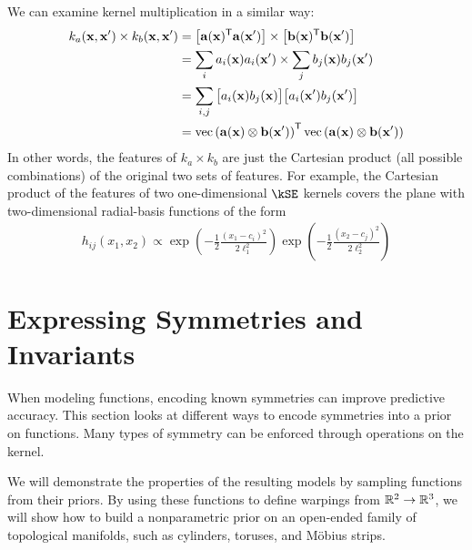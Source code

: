 We can examine kernel multiplication in a similar way:
%
\begin{align}
k_a({\bf{x}}, {\bf{x}}') \times k_b({\bf{x}}, {\bf{x}}')
& = \left[ {\bf{a}}({\bf{x}})^{\mathsf{T}} {\bf{a}}({\bf{x}}') \right] \times \left[ {\bf{b}}({\bf{x}})^{\mathsf{T}} {\bf{b}}({\bf{x}}') \right] \\
& = \sum_i a_i({\bf{x}}) a_i({\bf{x}}') \times \sum_j b_j({\bf{x}}) b_j({\bf{x}}') \\
& = \sum_{i,j} \big[ a_i({\bf{x}}) b_j({\bf{x}}) \big] \big[ a_i({\bf{x}}') b_j({\bf{x}}') \big] \\
& = \operatorname{vec} \left( { {\bf{a}}({\bf{x}}) \otimes {\bf{b}}({\bf{x}}') } \right) ^{\mathsf{T}} \operatorname{vec} \left( { {\bf{a}}({\bf{x}}) \otimes {\bf{b}}({\bf{x}}')} \right) 
\end{align}
%
In other words, the features of $k_a \times k_b$ are just the Cartesian product (all possible combinations) of the original two sets of features.
For example, the Cartesian product of the features of two one-dimensional $\kSE$ kernels covers the plane with two-dimensional radial-basis functions of the form
%
\begin{align}
h_{ij}(x_1, x_2) \propto \exp \left( -\frac{1}{2} \frac{(x_1 - c_i)^2}{2\ell_1^2} \right) \exp \left( -\frac{1}{2} \frac{(x_2 - c_j)^2}{2\ell_2^2} \right)
\end{align}





\section{Expressing Symmetries and Invariants}
\label{sec:expressing-symmetries}

\def\gswitch{G_\textnormal{swap}}

When modeling functions, encoding known symmetries can improve predictive accuracy. 
This section looks at different ways to encode symmetries into a prior on functions.
Many types of symmetry can be enforced through operations on the kernel.

We will demonstrate the properties of the resulting models by sampling functions from their priors.
By using these functions to define warpings from $\mathbb{R}^2 \to \mathbb{R}^3$, we will show how to build a nonparametric prior on an open-ended family of topological manifolds, such as cylinders, toruses, and M\"{o}bius strips.

